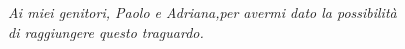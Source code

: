 \vspace*{3.5cm}

\large
\begin{flushright}
\itshape{Ai miei genitori, Paolo e Adriana,per avermi dato la possibilità\\di raggiungere questo traguardo.}
\end{flushright}
